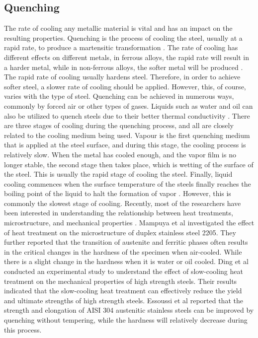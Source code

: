 \subsection{Quenching}  
The rate of cooling any metallic material is vital and has an impact on the resulting properties. Quenching is the process of cooling the steel, usually at a rapid rate, to produce a martensitic transformation \cite{singh2020applied}. The rate of cooling has different effects on different metals, in ferrous alloys, the rapid rate will result in a harder metal, while in non-ferrous alloys, the softer metal will be produced \cite{mampuya2021effect}. The rapid rate of cooling usually hardens steel. Therefore, in order to achieve softer steel, a slower rate of cooling should be applied. However, this, of course, varies with the type of steel. 
Quenching can be achieved in numerous ways, commonly by forced air or other types of gases. Liquids such as water and oil can also be utilized to quench steels due to their better thermal conductivity \cite{singh2020applied}. There are three stages of cooling during the quenching process, and all are closely related to the cooling medium being used. Vapour is the first quenching medium that is applied at the steel surface, and during this stage, the cooling process is relatively slow. When the metal has cooled enough, and the vapor film is no longer stable, the second stage then takes place, which is wetting of the surface of the steel. This is usually the rapid stage of cooling the steel. Finally, liquid cooling commences when the surface temperature of the steels finally reaches the boiling point of the liquid to halt the formation of vapor \cite{marzorati2018green, protopopoff2011surface}. However, this is commonly the slowest stage of cooling.
Recently, most of the researchers have been interested in understanding the relationship between heat treatments, microstructure, and mechanical properties \cite{marzorati2018green, whitman1924effect, cai2018influence}. Mampuya et al \cite{mampuya2021effect} investigated the effect of heat treatment on the microstructure of duplex stainless steel 2205. They further reported that the transition of austenite and ferritic phases often results in the critical changes in the hardness of the specimen when air-cooled. While there is a slight change in the hardness when it is water or oil cooled. Ding et al \cite{ding2020experimental} conducted an experimental study to understand the effect of slow-cooling heat treatment on the mechanical properties of high strength steels. Their results indicated that the slow-cooling heat treatment can effectively reduce the yield and ultimate strengths of high strength steels. Essoussi et al \cite{essoussi2019heat} reported that the strength and elongation of AISI 304 austenitic stainless steels can be improved by quenching without tempering, while the hardness will relatively decrease during this process.
